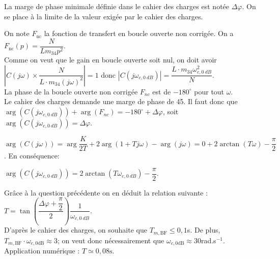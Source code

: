 La marge de phase minimale définie dans le cahier des charges est notée $\Delta \varphi$. On se place à la limite de la valeur exigée par le cahier des charges.
\fi

\ifprof
\begin{corrige}
On note $F_{\text{nc}}$  la fonction de transfert en boucle ouverte non corrigée. On a $F_{\text{nc}}(p)=\dfrac{N}{Lm_{34}p^2}$.\\

Comme on veut que le gain en boucle ouverte soit nul, on doit avoir $\left|  C(j\omega)\times \dfrac{N}{L\cdot m_{34}(j\omega)^2}\right| = 1$ donc $\boxed{\left| C\left(j\omega_{c,\SI{0}{dB}}\right)\right| = \dfrac{L\cdot m_{34}\omega_{c,\SI{0}{dB}}^2}{N}}$.\\

La phase de la boucle ouverte non corrigée $F_{nc}$ est de $-180^{\circ}$ pour tout $\omega$.\\

Le cahier des charges demande une marge de phase de 45\degres. Il faut donc que 
$\arg\left(C\left(j\omega_{c,\SI{0}{dB}}\right)\right) + \arg(F_{nc}) =-180^{\circ} + \Delta\varphi$,
soit $\boxed{\arg\left(C\left(j\omega_{c,\SI{0}{dB}}\right)\right)=\Delta\varphi}$.
\end{corrige}
\else
\fi

\ifprof
\begin{corrige}
$\arg\left(C\left(j\omega\right)\right)=\arg{\dfrac{K}{2T}}+2\arg\left(1+Tj\omega\right)-\arg(j\omega)=0+2\arctan\left(T\omega\right)-\dfrac{\pi}{2}$. En conséquence:
  
$\arg\left(C\left(j\omega_{c,\SI{0}{dB}}\right)\right) = 2\arctan\left(T\omega_{c,\SI{0}{dB}}\right)-\dfrac{\pi}{2}$.

Grâce à la question précédente on en déduit la relation suivante : $\boxed{T=\tan\left(\dfrac{\Delta\varphi+\dfrac{\pi}{2}}{2}\right) \dfrac{1}{\omega_{c,\SI{0}{dB}}}}$.\\
D'après le cahier des charges, on souhaite que $T_{m,\text{BF}}\leq 0,1$s. De plus, $T_{m,\text{BF}}\cdot \omega_{c,0\text{dB}} \approx 3$; on veut donc nécessairement que $\omega_{c,0\text{dB}}\approx 30$rad.s$^{-1}$.\\
Application numérique : $\boxed{T \simeq 0,08\text{s}}$.

\end{corrige}
\else
\fi


